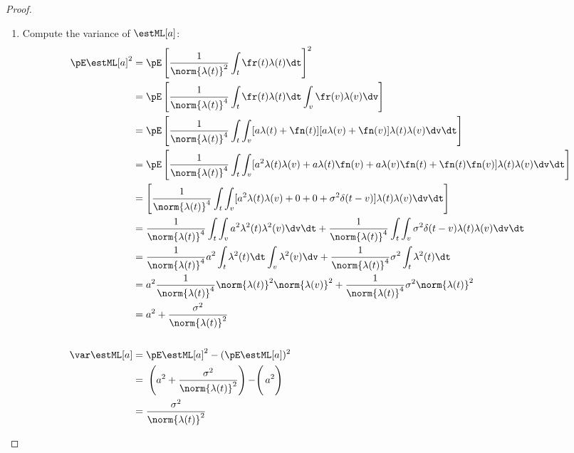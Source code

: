 \begin{proof}
\begin{enumerate}
\item Compute the variance of $\estML[a]$:
\begin{align*}
  \pE \estML[a]^2
    &= \pE \left[ \frac{1}{\norm{\lambda(t)}^2} \int_t \fr(t)\lambda(t) \dt\right]^2
  \\&= \pE \left[  \frac{1}{\norm{\lambda(t)}^4}
        \int_t \fr(t)\lambda(t) \dt \int_v \fr(v)\lambda(v) \dv
        \right]
  \\&= \pE \left[  \frac{1}{\norm{\lambda(t)}^4}
        \int_t \int_v [a\lambda(t) + \fn(t)][a\lambda(v) + \fn(v)]
        \lambda(t) \lambda(v)
        \dv\dt \right]
  \\&= \pE \left[  \frac{1}{\norm{\lambda(t)}^4}
        \int_t \int_v
        [a^2\lambda(t)\lambda(v) + a\lambda(t)\fn(v) + a\lambda(v)\fn(t) + \fn(t)\fn(v)]
        \lambda(t) \lambda(v)
        \dv\dt \right]
  \\&= \left[  \frac{1}{\norm{\lambda(t)}^4}
        \int_t \int_v
        [a^2\lambda(t)\lambda(v) + 0 + 0 + \sigma^2\delta(t-v)]
        \lambda(t) \lambda(v)
        \dv\dt \right]
  \\&= \frac{1}{\norm{\lambda(t)}^4}
        \int_t \int_v a^2\lambda^2(t)\lambda^2(v) \dv\dt +
        \frac{1}{\norm{\lambda(t)}^4}
        \int_t \int_v \sigma^2\delta(t-v) \lambda(t) \lambda(v) \dv\dt
  \\&= \frac{1}{\norm{\lambda(t)}^4}
        a^2 \int_t \lambda^2(t) \dt \int_v \lambda^2(v) \dv +
        \frac{1}{\norm{\lambda(t)}^4}
        \sigma^2\int_t \lambda^2(t) \dt
  \\&= a^2 \frac{1}{\norm{\lambda(t)}^4}
        \norm{\lambda(t)}^2 \norm{\lambda(v)}^2 +
        \frac{1}{\norm{\lambda(t)}^4}
        \sigma^2 \norm{\lambda(t)}^2
  \\&= a^2 + \frac{\sigma^2}{\norm{\lambda(t)}^2}
\\
\\
  \var\estML[a]
    &= \pE \estML[a]^2 - (\pE \estML[a])^2
  \\&= \left.\left.\left(a^2 + \frac{\sigma^2}{\norm{\lambda(t)}^2}\right) - \right( a^2 \right)
  \\&= \frac{\sigma^2}{\norm{\lambda(t)}^2}
\end{align*}


\end{enumerate}
\end{proof}
